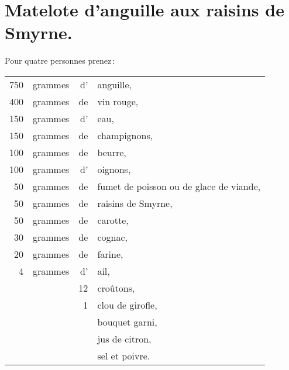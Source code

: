 \section*{\centering Matelote d’anguille aux raisins de Smyrne.}

Pour quatre personnes prenez :

\medskip

\footnotesize
\begin{longtable}{rrrp{16em}}
    750 & grammes & d' & anguille,                                                                        \\
    400 & grammes & de & vin rouge,                                                                       \\
    150 & grammes & d' & eau,                                                                             \\
    150 & grammes & de & champignons,                                                                     \\
    100 & grammes & de & beurre,                                                                          \\
    100 & grammes & d' & oignons,                                                                         \\
     50 & grammes & de & fumet de poisson ou de glace de viande,                                          \\
     50 & grammes & de & raisins de Smyrne,                                                               \\
     50 & grammes & de & carotte,                                                                         \\
     30 & grammes & de & cognac,                                                                          \\
     20 & grammes & de & farine,                                                                          \\
      4 & grammes & d' & ail,                                                                             \\
        &         & 12 & croûtons,                                                                        \\
        &         &  1 & clou de girofle,                                                                 \\
        &         &    & bouquet garni,                                                                   \\
        &         &    & jus de citron,                                                                   \\
        &         &    & sel et poivre.                                                                   \\
\end{longtable}
\normalsize

